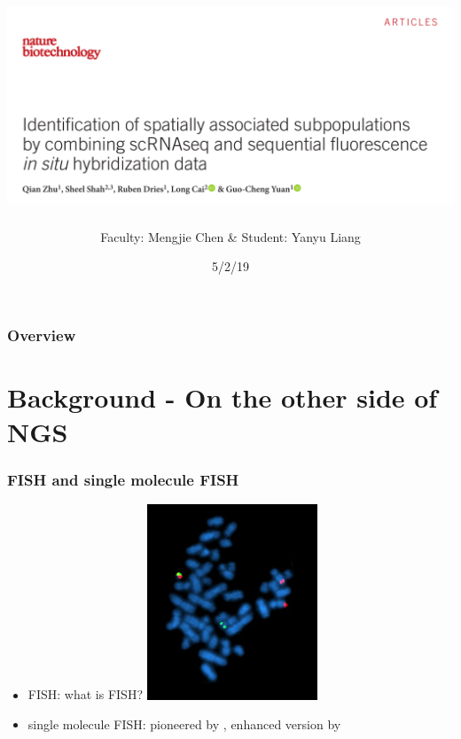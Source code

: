 \documentclass{beamer}
\title{\includegraphics[width=\textwidth]{title}} %
\author{Faculty: Mengjie Chen \& Student: Yanyu Liang}
\institute[]
{
GGSB Journal Club
}
\date{5/2/19} %
\begin{document}
\begin{frame}
\titlepage %
\end{frame}
\begin{frame}
\frametitle{Overview} %
\tableofcontents %
\end{frame}



\section{Background - On the other side of NGS}

  \begin{frame}
  \frametitle{FISH and single molecule FISH}
  \begin{itemize}
    \item FISH: what is FISH?
    \includegraphics[width=0.4\textwidth]{Bcrablmet}
    \cite{wiki:Fluorescence_in_situ_hybridization}
    \item single molecule FISH: pioneered by \cite{femino1998visualization}, enhanced version by \cite{raj2006stochastic}
  \end{itemize}
  \end{frame}
\end{document}
